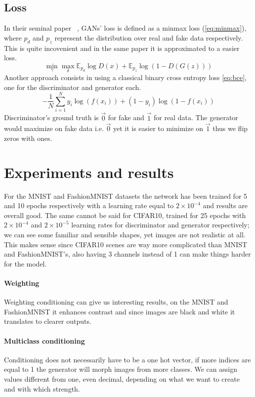 \documentclass[10pt,twocolumn,letterpaper]{article}
\begin{document}
\subsection{Loss}
In their seminal paper ~\cite{goodfellow2014generative}, GANs' loss is defined as a minmax loss (\ref{eq:minmax}), where $p_d$ and $p_z$ represent the distribution over real and fake data respectively.
This is quite incovenient and in the same paper it is approximated to a easier loss.
\begin{equation}
   \label{eq:minmax}
   \min_\gamma \max_\delta \mathbb{E}_{p_d} \log D(x) + \mathbb{E}_{p_z} \log (1-D(G(z)))
\end{equation}
Another approach consists in using a classical binary cross entropy loss \ref{eq:bce}, one for the discriminator and generator each.
\begin{equation}
   \label{eq:bce}
   -\frac{1}{N} \sum_{i=1}^N y_i \log (f(x_i)) + (1-y_i) \log (1-f(x_i))
\end{equation}
Discriminator's ground truth is $\vec{0}$ for fake and $\vec{1}$ for real data.
The generator would maximize on fake data i.e. $\vec{0}$ yet it is easier to minimize on $\vec{1}$ thus we flip zeros with ones.

\section{Experiments and results}
For the MNIST and FashionMNIST datasets the network has been trained for 5 and 10 epochs respectively with a learning rate equal to $2\times10^{-4}$ and results are overall good.
The same cannot be said for CIFAR10, trained for 25 epochs with $2\times 10^{-4}$ and $2\times10^{-5}$ learning rates for discriminator and generator respectively; we can see some familiar and sensible shapes, yet images are not realistic at all.
This makes sense since CIFAR10 scenes are way more complicated than MNIST and FashionMNIST's, also having 3 channels instead of 1 can make things harder for the model.

\paragraph{Weighting}
Weighting conditioning can give us interesting results, on the MNIST and FashionMNIST it enhances contrast and since images are black and white it translates to clearer outputs.

\paragraph{Multiclass conditioning}
Conditioning does not necessarily have to be a one hot vector, if more indices are equal to 1 the generator will morph images from more classes.
We can assign values different from one, even decimal, depending on what we want to create and with which strength.
\end{document}
